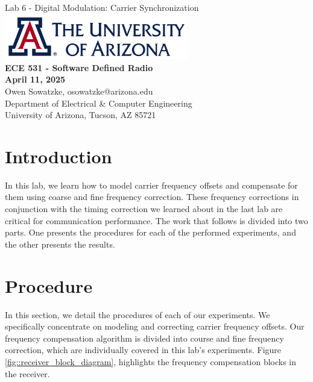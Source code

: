 \documentclass{article}
\begin{document}
\begin{titlepage}
	\centering
	{\huge Lab 6 - Digital Modulation: Carrier Synchronization}\\[0.25 in]
	\includegraphics[width=0.6\textwidth]{ua_logo.png}\\[0.25 in]
	{\large \textbf{ECE 531 - Software Defined Radio\\[0.25 in]
	April 11, 2025\\[0.25 in]}}
	{\large Owen Sowatzke, osowatzke@arizona.edu\\[0.05 in]
	Department of Electrical \& Computer Engineering\\[0.05 in]
	University of Arizona, Tucson, AZ 85721\\[0.5 in]}
	\hypersetup{linkcolor=navy-blue}
	\noindent\hrulefill
	\tableofcontents
	\noindent\hrulefill
\end{titlepage}


\section{Introduction}

In this lab, we learn how to model carrier frequency offsets and compensate for them using coarse and fine frequency correction. These frequency corrections in conjunction with the timing correction we learned about in the last lab are critical for communication performance. The work that follows is divided into two parts. One presents the procedures for each of the performed experiments, and the other presents the results.

\section{Procedure}

In this section, we detail the procedures of each of our experiments. We specifically concentrate on modeling and correcting carrier frequency offsets. Our frequency compensation algorithm is divided into course and fine frequency correction, which are individually covered in this lab's experiments. Figure \ref{fig::receiver_block_diagram}, highlights the frequency compensation blocks in the receiver.
\end{document}
